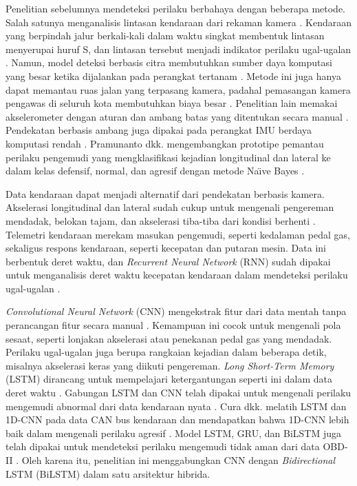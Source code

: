 Penelitian sebelumnya mendeteksi perilaku berbahaya dengan beberapa metode. Salah satunya menganalisis lintasan kendaraan dari rekaman kamera \cite{Sutikno2025}. Kendaraan yang berpindah jalur berkali-kali dalam waktu singkat membentuk lintasan menyerupai huruf S, dan lintasan tersebut menjadi indikator perilaku ugal-ugalan \cite{Chauhan2020}. Namun, model deteksi berbasis citra membutuhkan sumber daya komputasi yang besar ketika dijalankan pada perangkat tertanam \cite{Heo2020}. Metode ini juga hanya dapat memantau ruas jalan yang terpasang kamera, padahal pemasangan kamera pengawas di seluruh kota membutuhkan biaya besar \cite{Chauhan2020}. Penelitian lain memakai akselerometer dengan aturan dan ambang batas yang ditentukan secara manual \cite{Boonmee2009}. Pendekatan berbasis ambang juga dipakai pada perangkat IMU berdaya komputasi rendah \cite{Khan2024}. Pramunanto dkk. mengembangkan prototipe pemantau perilaku pengemudi yang mengklasifikasi kejadian longitudinal dan lateral ke dalam kelas defensif, normal, dan agresif dengan metode Na\"{\i}ve Bayes \cite{Pramunanto2019}.

Data kendaraan dapat menjadi alternatif dari pendekatan berbasis kamera. Akselerasi longitudinal dan lateral sudah cukup untuk mengenali pengereman mendadak, belokan tajam, dan akselerasi tiba-tiba dari kondisi berhenti \cite{Khan2024}. Telemetri kendaraan merekam masukan pengemudi, seperti kedalaman pedal gas, sekaligus respons kendaraan, seperti kecepatan dan putaran mesin. Data ini berbentuk deret waktu, dan \textit{Recurrent Neural Network} (RNN) sudah dipakai untuk menganalisis deret waktu kecepatan kendaraan dalam mendeteksi perilaku ugal-ugalan \cite{Thakuri2025}.

\textit{Convolutional Neural Network} (CNN) mengekstrak fitur dari data mentah tanpa perancangan fitur secara manual \cite{LeCun1998}. Kemampuan ini cocok untuk mengenali pola sesaat, seperti lonjakan akselerasi atau penekanan pedal gas yang mendadak. Perilaku ugal-ugalan juga berupa rangkaian kejadian dalam beberapa detik, misalnya akselerasi keras yang diikuti pengereman. \textit{Long Short-Term Memory} (LSTM) dirancang untuk mempelajari ketergantungan seperti ini dalam data deret waktu \cite{Hochreiter1997}. Gabungan LSTM dan CNN telah dipakai untuk mengenali perilaku mengemudi abnormal dari data kendaraan nyata \cite{Jia2020}. Cura dkk. melatih LSTM dan 1D-CNN pada data CAN bus kendaraan dan mendapatkan bahwa 1D-CNN lebih baik dalam mengenali perilaku agresif \cite{Cura2021}. Model LSTM, GRU, dan BiLSTM juga telah dipakai untuk mendeteksi perilaku mengemudi tidak aman dari data OBD-II \cite{Michailidis2025}. Oleh karena itu, penelitian ini menggabungkan CNN dengan \textit{Bidirectional} LSTM (BiLSTM) dalam satu arsitektur hibrida.

